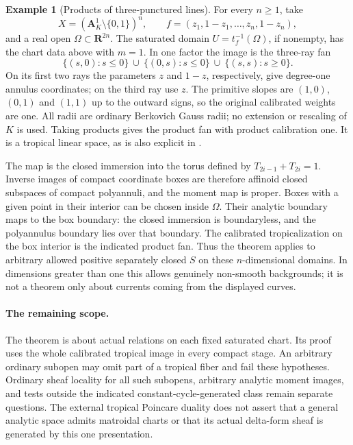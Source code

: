 \documentclass[11pt,a4paper]{article}
\numberwithin{equation}{section}
\theoremstyle{definition}
\newtheorem{example}[theorem]{Example}
\theoremstyle{remark}
\begin{document}
\begin{example}[Products of three-punctured lines]
\label{ex:r6-matroidal-pair-of-pants}
For every $n\geq1$, take
\[
       X=(\mathbf A^1_K\setminus\{0,1\})^n,
       \qquad f=(z_1,1-z_1,\ldots,z_n,1-z_n),
\]
and a real open $\Omega\subset\mathbf R^{2n}$.
The saturated domain $U=t_f^{-1}(\Omega)$, if nonempty, has the
chart data above with $m=1$.  In one factor the image is the
three-ray fan
\[
 \{(s,0):s\leq0\}\ \cup\ \{(0,s):s\leq0\}
       \ \cup\ \{(s,s):s\geq0\}.
\]
On its first two rays the parameters $z$ and $1-z$, respectively,
give degree-one annulus coordinates; on the third ray use $z$.
The primitive slopes are $(1,0)$, $(0,1)$ and $(1,1)$ up to the
outward signs, so the original calibrated weights are one.
All radii are ordinary Berkovich Gauss radii; no extension or
rescaling of $K$ is used.  Taking products gives the product fan
with product calibration one.  It is a tropical linear space,
as is also explicit in \cite[Lemma~3.1]{GS21}.

The map is the closed immersion into the torus defined by
$T_{2i-1}+T_{2i}=1$.  Inverse images of compact coordinate boxes
are therefore affinoid closed subspaces of compact polyannuli,
and the moment map is proper.  Boxes with a given point in
their interior can be chosen inside $\Omega$.  Their analytic
boundary maps to the box boundary: the closed immersion is
boundaryless, and the polyannulus boundary lies over that
boundary.  The calibrated tropicalization on the box interior
is the indicated product fan.  Thus the theorem applies to
arbitrary allowed positive separately closed $S$ on these
$n$-dimensional domains.  In dimensions greater than one this
allows genuinely non-smooth backgrounds; it is not a theorem
only about currents coming from the displayed curves.
\end{example}

\paragraph{The remaining scope.}
The theorem is about actual relations on each fixed saturated
chart.  Its proof uses the whole calibrated tropical image in
every compact stage.  An arbitrary ordinary subopen may omit
part of a tropical fiber and fail these hypotheses.  Ordinary
sheaf locality for all such subopens, arbitrary analytic moment
images, and tests outside the indicated constant-cycle-generated
class remain separate questions.  The external tropical
Poincare duality does not assert that a general analytic space
admits matroidal charts or that its actual delta-form sheaf is
generated by this one presentation.
\end{document}
